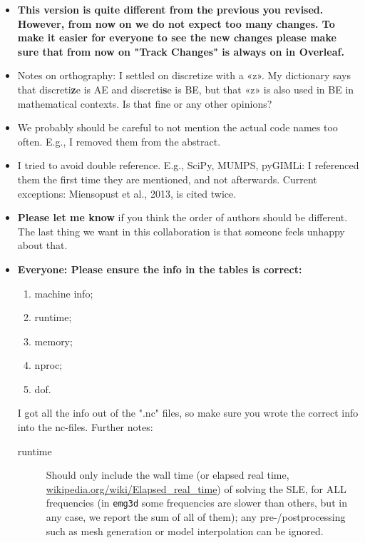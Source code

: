 \documentclass[
    paper,
  ]{geophysics}
\newcommand{\emg}[2]{\texttt{emg#1#2}\xspace}
\newcommand{\itodo}[1]{\todo[inline]{\sffamily #1}}
\begin{document}
\newpage
\itodo{\hfill$\Downarrow$\hfill$\Downarrow$\hfill List of things ToDo, Notes, etc\hfill$\Downarrow$\hfill$\Downarrow$\hfill~}
\begin{itemize}
    \item {\color{red}\bfseries This version is quite different from the previous you revised. However, from now on we do not expect too many changes. To make it easier for everyone to see the new changes please make sure that from now on "Track Changes" is always on in Overleaf.}
    \item Notes on orthography: I settled on discretize with a «z». My dictionary says that discreti{\color{red}\bfseries z}e is AE and discreti{\color{red}\bfseries s}e is BE, but that «z» is also used in BE in mathematical contexts. Is that fine or any other opinions?
    \item We probably should be careful to not mention the actual code names too often. E.g., I removed them from the abstract.
    \item I tried to avoid double reference. E.g., SciPy, MUMPS, pyGIMLi: I referenced them the first time they are mentioned, and not afterwards. Current exceptions: Miensopust et al., 2013, is cited twice.
    \item {\color{red}\bfseries Please let me know} if you think the order of authors should be different. The last thing we want in this collaboration is that someone feels unhappy about that.
    \item  {\color{red}\bfseries Everyone: Please ensure the info in the tables is correct:}
      \begin{enumerate}
          \item machine info;
          \item runtime;
          \item memory;
          \item nproc;
          \item dof.
      \end{enumerate}
    I got all the info out of the ".nc" files, so make sure you wrote the correct info into the nc-files. Further notes:
      \begin{description}
        \item[runtime] Should only include the wall time (or elapsed real time, \href{https://en.wikipedia.org/wiki/Elapsed_real_time}{wikipedia.org/\-wiki/\-Elapsed\-\_real\-\_time}) of solving the SLE, for ALL frequencies (in \emg3d some frequencies are slower than others, but in any case, we report the sum of all of them); any pre-/postprocessing such as mesh generation or model interpolation can be ignored.

\end{description}
\end{itemize}
\end{document}

